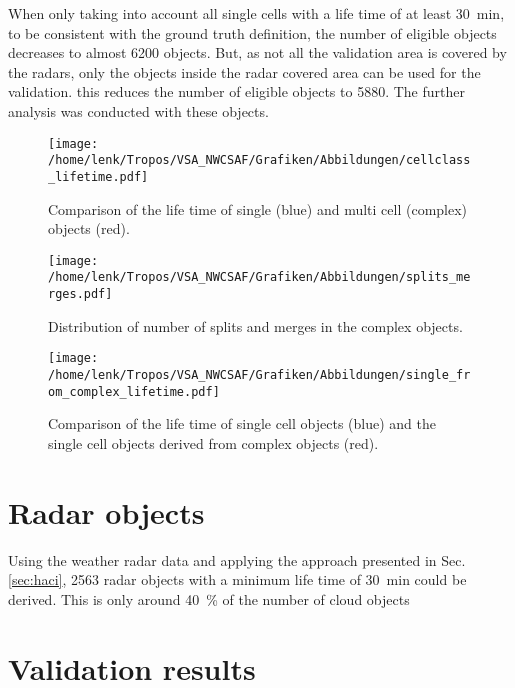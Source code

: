 When only taking into account all single cells with a life time of at least \SI{30}{\minute}, to be consistent with the ground truth definition, the number of eligible objects decreases to almost \num{6200} objects. But, as not all the validation area is covered by the radars, only the objects inside the radar covered area can be used for the validation. this reduces the number of eligible objects to 5880. The further analysis was conducted with these objects.

\begin{figure}[htbp]
\centering
\texttt{[image: /home/lenk/Tropos/VSA\_NWCSAF/Grafiken/Abbildungen/cellclass\_lifetime.pdf]}
\caption{Comparison of the life time of single (blue) and multi cell (complex) objects (red).}
\label{fig:cell_ltime}
\end{figure}

\begin{figure}[htbp]
\centering
\texttt{[image: /home/lenk/Tropos/VSA\_NWCSAF/Grafiken/Abbildungen/splits\_merges.pdf]}
\caption{Distribution of number of splits and merges in the complex objects.}
\label{fig:splits_merges}
\end{figure}

\begin{figure}[htbp]
\centering
\texttt{[image: /home/lenk/Tropos/VSA\_NWCSAF/Grafiken/Abbildungen/single\_from\_complex\_lifetime.pdf]}
\caption{Comparison of the life time of single cell objects (blue) and the single cell objects derived from complex objects (red).}
\label{fig:single_cell}
\end{figure}

\section{Radar objects}
Using the weather radar data and applying the approach presented in Sec. \ref{sec:haci}, \num{2563} radar objects with a minimum life time of \SI{30}{\minute} could be derived. This is only around \SI{40}{\percent} of the number of cloud objects

\section{Validation results}




